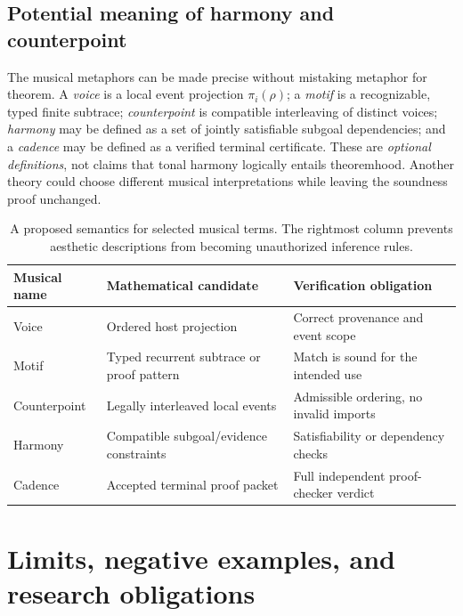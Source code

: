 \documentclass[11pt,letterpaper]{article}
\theoremstyle{definition}
\theoremstyle{remark}
\begin{document}
\subsection{Potential meaning of harmony and counterpoint}
The musical metaphors can be made precise without mistaking metaphor for theorem. A \emph{voice} is a local event projection $\pi_i(\rho)$; a \emph{motif} is a recognizable, typed finite subtrace; \emph{counterpoint} is compatible interleaving of distinct voices; \emph{harmony} may be defined as a set of jointly satisfiable subgoal dependencies; and a \emph{cadence} may be defined as a verified terminal certificate. These are \emph{optional definitions}, not claims that tonal harmony logically entails theoremhood. Another theory could choose different musical interpretations while leaving the soundness proof unchanged.

\begin{table}[htbp]
\centering\small
\begin{tabularx}{\textwidth}{@{}p{}p{}X@{}}
\toprule
\textbf{Musical name} & \textbf{Mathematical candidate} & \textbf{Verification obligation}\\
\midrule
Voice & Ordered host projection & Correct provenance and event scope\\
Motif & Typed recurrent subtrace or proof pattern & Match is sound for the intended use\\
Counterpoint & Legally interleaved local events & Admissible ordering, no invalid imports\\
Harmony & Compatible subgoal/evidence constraints & Satisfiability or dependency checks\\
Cadence & Accepted terminal proof packet & Full independent proof-checker verdict\\
\bottomrule
\end{tabularx}
\caption{A proposed semantics for selected musical terms. The rightmost column prevents aesthetic descriptions from becoming unauthorized inference rules.}
\end{table}

\section{Limits, negative examples, and research obligations}
\end{document}
